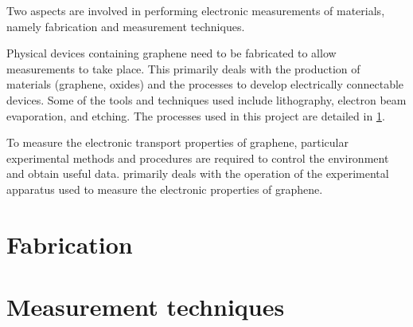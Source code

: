 \documentclass[../Matt_Gebert_Honours_Thesis.tex]{subfiles}
\begin{document}
	

	Two aspects are involved in performing electronic measurements of materials, namely fabrication and measurement techniques. 
	
	Physical devices containing graphene need to be fabricated to allow measurements to take place. This primarily deals with the production of materials (graphene, oxides) and the processes to develop electrically connectable devices. Some of the tools and techniques used include lithography, electron beam evaporation, and etching. The processes used in this project are detailed in \cref{sec:fabrication}.
	
	To measure the electronic transport properties of graphene, particular experimental methods and procedures are required to control the environment and obtain useful data.  primarily deals with the operation of the experimental apparatus used to measure the electronic properties of graphene.

	\section{Fabrication}\label{sec:fabrication}
	
		
	\section{Measurement techniques}\label{sec:measurements}
	
	
\end{document}
